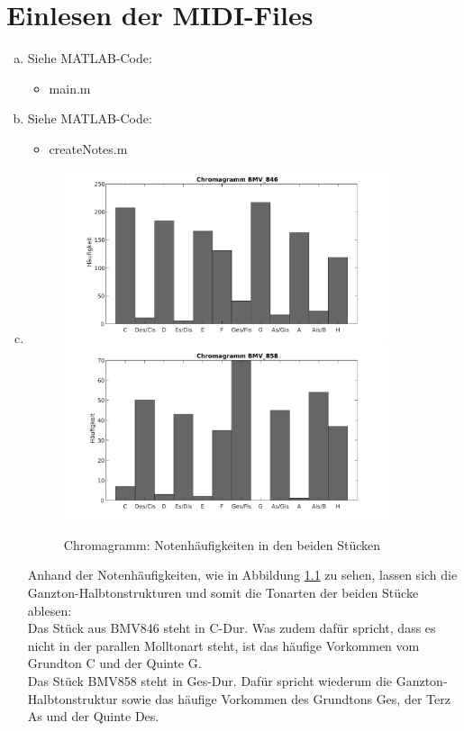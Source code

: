 \chapter{Einlesen der MIDI-Files}


\begin{enumerate}[a)]
\item
Siehe MATLAB-Code:
\begin{itemize}
\item
main.m
\end{itemize}

\item
Siehe MATLAB-Code:
\begin{itemize}
\item
createNotes.m
\end{itemize}
\item
\begin{figure}
  \centering
      \includegraphics[width=0.9\textwidth]{Figures/Chromagram1}
      \includegraphics[width=0.9\textwidth]{Figures/Chromagram2}
 \caption{Chromagramm: Notenhäufigkeiten in den beiden Stücken}
	\label{fig:chr}
\end{figure}
Anhand der Notenhäufigkeiten, wie in Abbildung \ref{fig:chr} zu sehen, lassen sich die Ganzton-Halbtonstrukturen und somit die Tonarten der beiden Stücke ablesen:\\
Das Stück aus BMV846 steht in C-Dur. Was zudem dafür spricht, dass es nicht in der parallen Molltonart steht, ist das häufige Vorkommen vom Grundton C und der Quinte G.\\
Das Stück BMV858 steht in Ges-Dur. Dafür spricht wiederum die Ganzton-Halbtonstruktur sowie das häufige Vorkommen des Grundtons Ges, der Terz As und der Quinte Des.
\end{enumerate}


